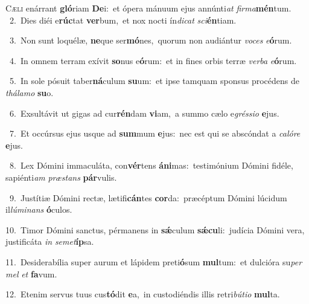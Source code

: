 \lettrine{\initial\textcolor{\initialcolor}{C}}{æli} enárrant \textbf{gló}\-riam \textbf{De}\-i:~\star et ópera mánuum ejus annúnti\textit{at} \textit{fir}\-\textit{ma}\textbf{mén}tum.\\
{\numbfont\textcolor{\numbcolor}{~2.}}~Dies diéi e\-\textbf{rúc}\-tat \textbf{ver}\-bum,~\star et nox nocti ín\-\textit{di}\-\textit{cat} \textit{sci}\-\textbf{én}tiam.\par
{\numbfont\textcolor{\numbcolor}{~3.}}~Non sunt loquélæ, \textbf{ne}\-que ser\-\textbf{mó}\-nes,~\star quorum non audiántur \textit{vo}\-\textit{ces} \textit{e}\-\textbf{ó}rum.\par
{\numbfont\textcolor{\numbcolor}{~4.}}~In omnem terram exívit \textbf{so}\-nus e\-\textbf{ó}\-rum:~\star et in fines orbis terræ \textit{ver}\-\textit{ba} \textit{e}\-\textbf{ó}rum.\par
{\numbfont\textcolor{\numbcolor}{~5.}}~In sole pósuit taber\-\textbf{ná}\-culum \textbf{su}\-um:~\star et ipse tamquam sponsus procédens de \textit{thá}\-\textit{la}\textit{mo} \textbf{su}\-o.\par
{\numbfont\textcolor{\numbcolor}{~6.}}~Exsultávit ut gigas ad cur\-\textbf{rén}\-dam \textbf{vi}\-am,~\star a summo cælo e\-\textit{grés}\-\textit{si}\textit{o} \textbf{e}\-jus.\par
{\numbfont\textcolor{\numbcolor}{~7.}}~Et occúrsus ejus usque ad \textbf{sum}\-mum \textbf{e}\-jus:~\star nec est qui se abscóndat a \textit{ca}\-\textit{ló}\textit{re} \textbf{e}\-jus.\par
{\numbfont\textcolor{\numbcolor}{~8.}}~Lex Dómini immaculáta, con\-\textbf{vér}\-tens \textbf{á}\-\textbf{ni}mas:~\star testimónium Dómini fidéle, sapiénti\textit{am} \textit{præ}\-\textit{stans} \textbf{pár}\-vulis.\par
{\numbfont\textcolor{\numbcolor}{~9.}}~Justítiæ Dómini rectæ, lætifi\-\textbf{cán}\-tes \textbf{cor}\-da:~\star præcéptum Dómini lúcidum il\-\textit{lú}\-\textit{mi}\textit{nans} \textbf{ó}\-culos.\par
{\numbfont\textcolor{\numbcolor}{10.}}~Timor Dómini sanctus, pérmanens in \textbf{sǽ}\-culum \textbf{sǽ}\-\textbf{cu}li:~\star judícia Dómini vera, justificáta \textit{in} \textit{se}\-\textit{met}\textbf{íp}sa.\par
{\numbfont\textcolor{\numbcolor}{11.}}~Desiderabília super aurum et lápidem preti\-\textbf{ó}\-sum \textbf{mul}\-tum:~\star et dulcióra su\textit{per} \textit{mel} \textit{et} \textbf{fa}\-vum.\par
{\numbfont\textcolor{\numbcolor}{12.}}~Etenim servus tuus cus\-\textbf{tó}\-dit \textbf{e}\-a,~\star in custodiéndis illis retri\-\textit{bú}\-\textit{ti}\textit{o} \textbf{mul}\-ta.\par

